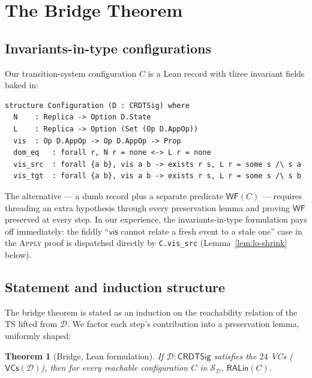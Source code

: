 \documentclass[11pt,a4paper]{article}
\newtheorem{theorem}{Theorem}[section]
\theoremstyle{definition}
\theoremstyle{remark}
\newcommand{\RDT}{\ensuremath{\mathcal{D}}}
\newcommand{\mvis}{\mathsf{vis}}
\newcommand{\RALin}{\mathsf{RALin}}
\newcommand{\VCs}{\mathsf{VCs}}
\newcommand{\wellformed}{\mathsf{WF}}
\begin{document}
\section{The Bridge Theorem}
\label{sec:bridge}

\subsection{Invariants-in-type configurations}
\label{sec:invariants}

Our transition-system configuration $C$ is a Lean record with three
invariant fields baked in:
\begin{lstlisting}[caption={\texttt{Configuration} with invariants,
                           \texttt{Sal/Emulation/CRDT\_TS.lean}.},
                   label=lst:config]
structure Configuration (D : CRDTSig) where
  N    : Replica -> Option D.State
  L    : Replica -> Option (Set (Op D.AppOp))
  vis  : Op D.AppOp -> Op D.AppOp -> Prop
  dom_eq   : forall r, N r = none <-> L r = none
  vis_src  : forall {a b}, vis a b -> exists r s, L r = some s /\ s a
  vis_tgt  : forall {a b}, vis a b -> exists r s, L r = some s /\ s b
\end{lstlisting}

The alternative --- a dumb record plus a separate predicate
$\wellformed(C)$ --- requires threading an extra hypothesis through
every preservation lemma and proving $\wellformed$ preserved at
every step. In our experience, the invariants-in-type formulation
pays off immediately: the fiddly ``$\mvis$ cannot relate a fresh event
to a stale one'' case in the \textsc{Apply} proof is dispatched
directly by \texttt{C.vis\_src} (Lemma~\ref{lem:lo-shrink} below).

\subsection{Statement and induction structure}
\label{sec:bridge-statement}

The bridge theorem is stated as an induction on the reachability
relation of the TS lifted from $\RDT$. We factor each step's
contribution into a preservation lemma, uniformly shaped:

\begin{theorem}[Bridge, Lean formulation]
\label{thm:bridge-lean}
If $\RDT : \mathsf{CRDTSig}$ satisfies the $24$ VCs
($\VCs(\RDT)$), then for every reachable configuration $C$ in
$\mathcal{S}_\RDT$, $\RALin(C)$.
\end{theorem}
\end{document}
